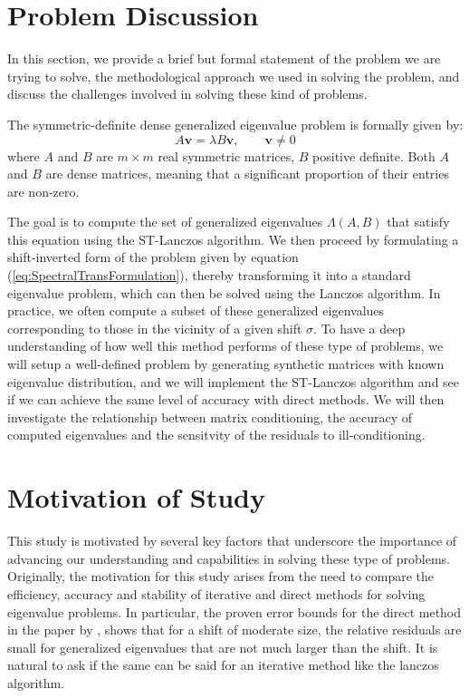 \section{Problem Discussion}\label{sec:ProblemDiscussion}
In this section, we provide a brief but formal statement of the problem we are trying to solve, the methodological approach we used in solving the problem, and discuss the challenges involved in solving these kind of problems.

The symmetric-definite dense generalized eigenvalue problem is formally given by:
\begin{equation}\label{eq:GenEigVal_Problem}
	A\mathbf{v} = \lambda B\mathbf{v}, \qquad \mathbf{v} \neq 0
\end{equation}
where $A$ and $B$ are $m \times m$ real symmetric matrices, $B$ positive definite. Both $A$ and $B$ are dense matrices, meaning that a significant proportion of their entries are non-zero.

The goal is to compute the set of generalized eigenvalues $\Lambda(A, B)$ that satisfy this equation using the ST-Lanczos algorithm. We then proceed by formulating a shift-inverted form of the problem given by equation (\ref{eq:SpectralTransFormulation}), thereby transforming it into a standard eigenvalue problem, which can then be solved using the Lanczos algorithm. In practice, we often compute a subset of these generalized eigenvalues corresponding to those in the vicinity of a given shift $\sigma$. To have a deep understanding of how well this method performs of these type of problems, we will setup a well-defined problem by generating synthetic matrices with known eigenvalue distribution, and we will implement the ST-Lanczos algorithm and see if we can achieve the same level of accuracy with direct methods. We will then investigate the relationship between matrix conditioning, the accuracy of computed eigenvalues and the sensitvity of the residuals to ill-conditioning.

\section{Motivation of Study}\label{sec:MoitavationOfStudy}
This study is motivated by several key factors that underscore the importance of advancing our understanding and capabilities in solving these type of problems. Originally, the motivation for this study arises from the need to compare the efficiency, accuracy and stability of iterative and direct methods for solving eigenvalue problems. In particular, the proven error bounds for the direct method in the paper by \cite{stewart2024spectraltransformationdensesymmetric}, shows that for a shift of moderate size, the relative residuals are small for generalized eigenvalues that are not much larger than the shift. It is natural to ask if the same can be said for an iterative method like the lanczos algorithm.

